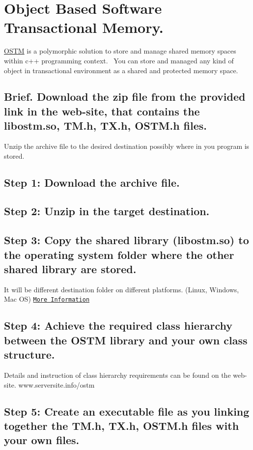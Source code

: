 \hypertarget{index_OSTM}{}\section{Object Based Software Transactional Memory.}\label{index_OSTM}
\hyperlink{class_o_s_t_m}{O\+S\+TM} is a polymorphic solution to store and manage shared memory spaces within c++ programming context.~\newline
 You can store and managed any kind of object in transactional environment as a shared and protected memory space.\hypertarget{index_install_sec}{}\subsection{Brief. Download the zip file from the provided link in the web-\/site, that contains the libostm.\+so, T\+M.\+h, T\+X.\+h, O\+S\+T\+M.\+h files.}\label{index_install_sec}
Unzip the archive file to the desired destination possibly where in you program is stored.\hypertarget{index_step1}{}\subsection{Step 1\+: Download the archive file.}\label{index_step1}
\hypertarget{index_step2}{}\subsection{Step 2\+: Unzip in the target destination.}\label{index_step2}
\hypertarget{index_step3}{}\subsection{Step 3\+: Copy the shared library (libostm.\+so) to the operating system folder where the other shared library are stored.}\label{index_step3}
It will be different destination folder on different platforms. (Linux, Windows, Mac OS) \href{http://serversite.info/ostm/#tutorial}{\tt More Information}\hypertarget{index_step4}{}\subsection{Step 4\+: Achieve the required class hierarchy between the O\+S\+T\+M library and your own class structure.}\label{index_step4}
Details and instruction of class hierarchy requirements can be found on the web-\/site. www.\+serversite.\+info/ostm\hypertarget{index_step5}{}\subsection{Step 5\+: Create an executable file as you linking together the T\+M.\+h, T\+X.\+h, O\+S\+T\+M.\+h files with your own files.}\label{index_step5}
